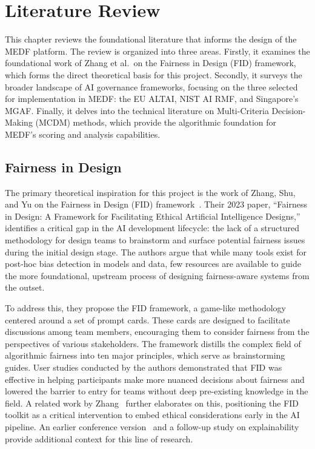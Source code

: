 \chapter{Literature Review}
\label{ch:literature}

This chapter reviews the foundational literature that informs the design of the MEDF platform. The review is organized into three areas. Firstly, it examines the foundational work of Zhang et al.\ on the Fairness in Design (FID) framework, which forms the direct theoretical basis for this project. Secondly, it surveys the broader landscape of AI governance frameworks, focusing on the three selected for implementation in MEDF: the EU ALTAI, NIST AI RMF, and Singapore's MGAF. Finally, it delves into the technical literature on Multi-Criteria Decision-Making (MCDM) methods, which provide the algorithmic foundation for MEDF's scoring and analysis capabilities.

\section{Fairness in Design}
\label{sec:fid}

The primary theoretical inspiration for this project is the work of Zhang, Shu, and Yu on the Fairness in Design (FID) framework~\cite{zhang2023fairness}. Their 2023 paper, \enquote{Fairness in Design: A Framework for Facilitating Ethical Artificial Intelligence Designs,} identifies a critical gap in the AI development lifecycle: the lack of a structured methodology for design teams to brainstorm and surface potential fairness issues during the initial design stage. The authors argue that while many tools exist for post-hoc bias detection in models and data, few resources are available to guide the more foundational, upstream process of designing fairness-aware systems from the outset.

To address this, they propose the FID framework, a game-like methodology centered around a set of prompt cards. These cards are designed to facilitate discussions among team members, encouraging them to consider fairness from the perspectives of various stakeholders. The framework distills the complex field of algorithmic fairness into ten major principles, which serve as brainstorming guides. User studies conducted by the authors demonstrated that FID was effective in helping participants make more nuanced decisions about fairness and lowered the barrier to entry for teams without deep pre-existing knowledge in the field. A related work by Zhang~\cite{zhang2023methodology} further elaborates on this, positioning the FID toolkit as a critical intervention to embed ethical considerations early in the AI pipeline. An earlier conference version~\cite{zhang2021fairness} and a follow-up study on explainability~\cite{zhang2022explainable} provide additional context for this line of research.


